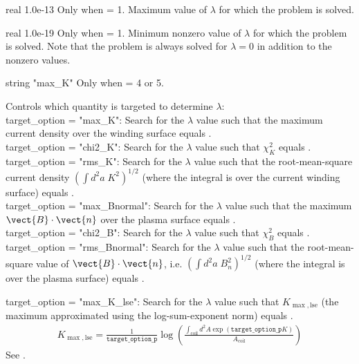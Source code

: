 \myhrule

{real}
{1.0e-13}
{Only when  = 1.}
{Maximum value of $\lambda$ for which the problem is solved.}

\myhrule

{real}
{1.0e-19}
{Only when  = 1.}
{Minimum nonzero value of $\lambda$ for which the problem is solved.
Note that the problem is always solved for $\lambda=0$ in addition to
the nonzero values.}

\myhrule

{string}
{{\ttfamily "max\_K"}}
{Only when  = 4 or 5.}
{Controls which quantity is targeted to determine $\lambda$:\\

{\ttfamily target\_option = "max\_K"}: Search for the $\lambda$ value such that the maximum
current density over the winding surface equals .\\

{\ttfamily target\_option = "chi2\_K"}: Search for the $\lambda$ value such that $\chi^2_K$ equals .\\

{\ttfamily target\_option = "rms\_K"}: Search for the $\lambda$ value such that the root-mean-square current density
$\left( \int d^2a\; K^2 \right)^{1/2}$ (where the integral is over the current winding surface) equals .\\

{\ttfamily target\_option = "max\_Bnormal"}: Search for the $\lambda$ value such that the maximum
$\vect{B}\cdot\vect{n}$ over the plasma surface equals .\\

{\ttfamily target\_option = "chi2\_B"}: Search for the $\lambda$ value such that $\chi^2_B$ equals .\\

{\ttfamily target\_option = "rms\_Bnormal"}: Search for the $\lambda$ value such that the root-mean-square value of $\vect{B}\cdot\vect{n}$, i.e.
$\left( \int d^2a\; B_n^2 \right)^{1/2}$ (where the integral is over the plasma surface) equals .

{\ttfamily target\_option = "max\_K\_lse"}: Search for the $\lambda$ value such that $K_{\max,\text{lse}}$ (the maximum approximated using the log-sum-exponent norm) equals .
\begin{gather}
K_{\max,\text{lse}} = \frac{1}{\texttt{target\_option\_p}} \log \left( \frac{\int_{\text{coil}} d^2 A \exp \left( \texttt{target\_option\_p}K \right)}{A_{\text{coil}}} \right)
\end{gather}
See .

}
